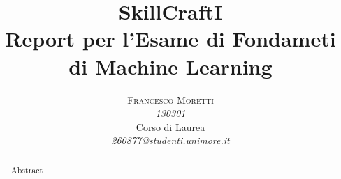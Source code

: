 \documentclass[12pt,a4paper]{article}
\begin{document}
\title{SkillCraftI\\
\Large{Report per l'Esame di Fondameti di Machine Learning}
}%
\author{\textsc{Francesco Moretti} \\
    \emph{130301} \\
    Corso di Laurea\\
    \emph{260877@studenti.unimore.it}
  }
\date{}
\maketitle
\clearpage

\begin{abstract}
\normalsize
Abstract 


\end{abstract}
\clearpage


\tableofcontents{}
\clearpage








\clearpage
{}

\end{document}
